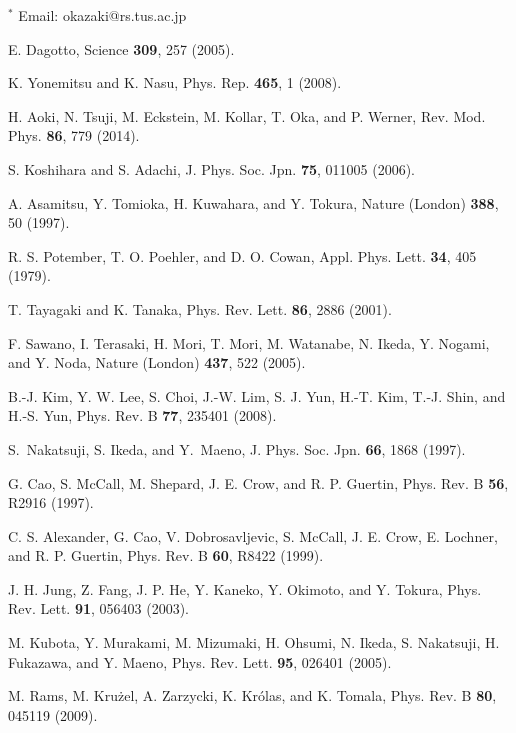 \documentclass[aps,twocolumn,showpacs,preprintnumbers,amsmath,amssymb,floats,citeautoscript,nobalancelastpage]{revtex4-1}
\begin{document}
\begin{thebibliography}{99}

\item[$^\ast$] Email: okazaki@rs.tus.ac.jp

E. Dagotto, Science {\bf 309}, 257 (2005).

K. Yonemitsu and K. Nasu, 
Phys. Rep. {\bf 465}, 1 (2008).

H. Aoki, N. Tsuji, M. Eckstein, M. Kollar, T. Oka, and P. Werner, 
Rev. Mod. Phys. {\bf 86}, 779 (2014).

S. Koshihara and S. Adachi,
J. Phys. Soc. Jpn. {\bf 75}, 011005 (2006).

A. Asamitsu, Y. Tomioka, H. Kuwahara, and Y. Tokura,
Nature (London) {\bf 388}, 50 (1997).

R. S. Potember, T. O. Poehler, and D. O. Cowan,
Appl. Phys. Lett. {\bf 34}, 405 (1979).

T. Tayagaki and K. Tanaka,
Phys. Rev. Lett. {\bf 86}, 2886 (2001).

F. Sawano, I. Terasaki, H. Mori, T. Mori, M. Watanabe, N. Ikeda, Y. Nogami, and Y. Noda,
Nature (London) {\bf 437}, 522 (2005).

B.-J. Kim, Y. W. Lee, S. Choi, J.-W. Lim, S. J. Yun, H.-T. Kim, T.-J. Shin, and H.-S. Yun,
Phys. Rev. B {\bf 77}, 235401 (2008).

S.~Nakatsuji, S. Ikeda, and Y.~Maeno, 
J. Phys. Soc. Jpn. {\bf 66}, 1868 (1997).

G. Cao, S. McCall, M. Shepard, J. E. Crow, and R. P. Guertin,
Phys. Rev. B {\bf 56}, R2916 (1997).

C. S. Alexander, G. Cao, V. Dobrosavljevic, S. McCall,  J. E. Crow, E. Lochner, and R. P. Guertin,
Phys. Rev. B {\bf 60}, R8422 (1999).

J. H. Jung, Z. Fang, J. P. He, Y. Kaneko, Y. Okimoto, and Y. Tokura,
Phys. Rev. Lett. {\bf 91}, 056403 (2003).

M. Kubota, Y. Murakami, M. Mizumaki, H. Ohsumi, N. Ikeda, S. Nakatsuji, H. Fukazawa, and Y. Maeno,
Phys. Rev. Lett. {\bf 95}, 026401 (2005).

M. Rams, M. Kru\ifmmode {}\else \.{z}\fi{}el, A. Zarzycki, K. Kr\'olas, and K. Tomala,
Phys. Rev. B {\bf 80}, 045119 (2009).


\end{thebibliography}
\end{document}
